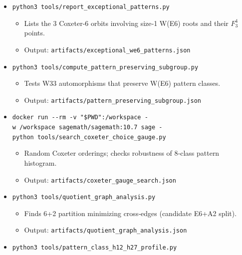 \documentclass[11pt]{article}
\providecommand{\tightlist}{%
  \setlength{\itemsep}{0pt}\setlength{\parskip}{0pt}}
\begin{document}
\begin{itemize}
  \begin{itemize}
  \tightlist
  \item
    Builds the 8‑class quotient graph by W(E6) intersection patterns.
  \item
    Output: \texttt{artifacts/pattern\_quotient\_graph.json}
  \end{itemize}
\item
  \texttt{python3\ tools/report\_exceptional\_patterns.py}

  \begin{itemize}
  \tightlist
  \item
    Lists the 3 Coxeter‑6 orbits involving size‑1 W(E6) roots and their
    \(F_{3}^{4}\) points.
  \item
    Output: \texttt{artifacts/exceptional\_we6\_patterns.json}
  \end{itemize}
\item
  \texttt{python3\ tools/compute\_pattern\_preserving\_subgroup.py}

  \begin{itemize}
  \tightlist
  \item
    Tests W33 automorphisms that preserve W(E6) pattern classes.
  \item
    Output: \texttt{artifacts/pattern\_preserving\_subgroup.json}
  \end{itemize}
\item
  \texttt{docker\ run\ -\/-rm\ -v\ "\$PWD":/workspace\ -w\ /workspace\ sagemath/sagemath:10.7\ sage\ -python\ tools/search\_coxeter\_choice\_gauge.py}

  \begin{itemize}
  \tightlist
  \item
    Random Coxeter orderings; checks robustness of 8‑class pattern
    histogram.
  \item
    Output: \texttt{artifacts/coxeter\_gauge\_search.json}
  \end{itemize}
\item
  \texttt{python3\ tools/quotient\_graph\_analysis.py}

  \begin{itemize}
  \tightlist
  \item
    Finds 6+2 partition minimizing cross‑edges (candidate E6+A2 split).
  \item
    Output: \texttt{artifacts/quotient\_graph\_analysis.json}
  \end{itemize}
\item
  \texttt{python3\ tools/pattern\_class\_h12\_h27\_profile.py}


\end{itemize}
\end{document}
